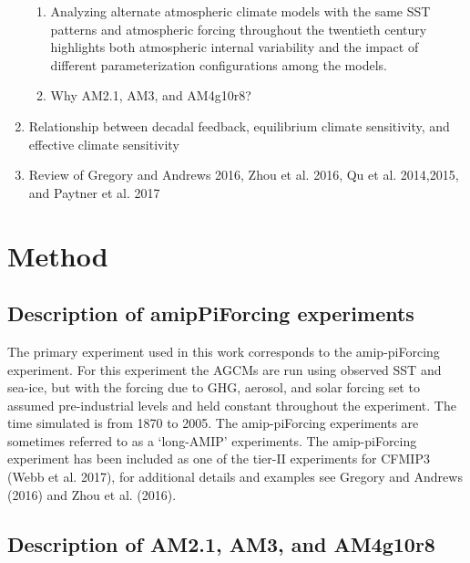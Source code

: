 \documentclass[grl]{agutex2015}
\begin{document}
\begin{article}
\begin{enumerate}
\begin{enumerate}
	    \item Analyzing alternate atmospheric climate models with the same SST 
	    patterns and atmospheric forcing throughout the twentieth century highlights
	    both atmospheric internal variability and the impact of different parameterization 
	    configurations among the models.
	    \item Why AM2.1, AM3, and AM4g10r8?
	\end{enumerate}
	\item Relationship between decadal feedback, equilibrium climate sensitivity, and effective climate sensitivity
	\item Review of Gregory and Andrews 2016, Zhou et al. 2016, Qu et al. 2014,2015, and Paytner et al. 2017
    \end{enumerate}

\section{Method}
\subsection{Description of amipPiForcing experiments}  
        
        The primary experiment used in this work corresponds to the amip-piForcing experiment.  For this experiment the AGCMs are run using observed SST and sea-ice, but with the forcing due to GHG, aerosol, and solar forcing set to assumed pre-industrial levels and held constant throughout the experiment.  The time simulated is from 1870 to 2005.  The amip-piForcing experiments are sometimes referred to as a `long-AMIP' experiments.  The amip-piForcing experiment has been included as one of the tier-II experiments for CFMIP3 (Webb et al. 2017), for additional details and examples see Gregory and Andrews (2016) and Zhou et al. (2016). 
        
\subsection{Description of AM2.1, AM3, and AM4g10r8}
        

\end{article}
\end{document}
